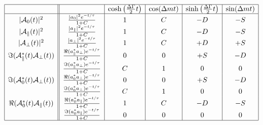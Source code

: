 \documentclass[a4paper,9pt,twoside]{article}
\begin{document}
\begin{equation}
\begin{array}{|c|| c | c | c | c | c |}
 \hline
                                             &                          &  \cosh\left(\frac{\Delta\Gamma}{2}t\right) &  \cos(\Delta m t)  & \sinh\left(\frac{\Delta\Gamma}{2}t\right) &\sin(\Delta m t)  \\
 \hline
|{\cal A}_0(t)|^2                           &\frac{  | a_0 |^2 e^{-t/\tau}}{1+C}                  & 1    &   C  &  -D & -S   \\
|{\cal A}_\parallel(t)|^2                   &\frac{  | a_\parallel |^2 e^{-t/\tau}}{1+C}          & 1    &   C  &  -D & -S   \\
|{\cal A}_\perp(t)|^2                       &\frac{  | a_\perp |^2 e^{-t/\tau}}{1+C}              & 1    &   C  &  +D & +S   \\
\Im({\cal A}_\parallel^*(t){\cal A}_\perp(t)) &\frac{  \Re(a_\parallel^* a_\perp)e^{-t/\tau}}{1+C}& 0      &   0       &  +S & -D   \\                         
                                            &\frac{  \Im(a_\parallel^* a_\perp)e^{-t/\tau}}{1+C}  & C &   1     &   0 & 0    \\
\Im({\cal A}_0^*(t){\cal A}_\perp(t))         &\frac{  \Re(a_0^* a_\perp)e^{-t/\tau}}{1+C}        & 0      &   0       &  +S & -D   \\
                                            &\frac{  \Im(a_0^* a_\perp)e^{-t/\tau}}{1+C}          & C &   1     &   0 &  0   \\
\Re({\cal A}_0^*(t){\cal A}_\parallel(t))     &\frac{  \Re(a_0^*a_\parallel)e^{-t/\tau}}{1+C}     & 1    &   C  &  -D & -S   \\
                                            &\frac{  \Im(a_0^*a_\parallel)e^{-t/\tau}}{1+C}       & 0      &   0       &   0 &  0   \\
\hline

\end{array}
\end{equation}
\end{document}
